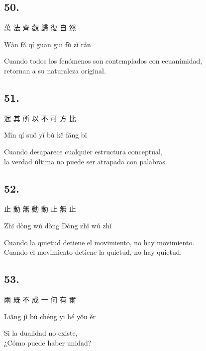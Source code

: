\documentclass[
  a5paperpaper,
]{article}
\begin{document}
\begin{verseblock}

\hypertarget{section-124}{%
\subsection{50.}\label{section-124}}

萬 法 齊 觀 歸 復 自 然

Wàn fă qí guān guī fù zì rán

Cuando todos los fenómenos son contemplados con ecuanimidad,\\
retornan a su naturaleza original.

\end{verseblock}

\begin{verseblock}

\hypertarget{section-125}{%
\subsection{51.}\label{section-125}}

泯 其 所 以 不 可 方 比

Mĭn qí suŏ yĭ bù kě fāng bĭ

Cuando desaparece cualquier estructura conceptual,\\
la verdad última no puede ser atrapada con palabras.

\end{verseblock}

\begin{verseblock}

\hypertarget{section-126}{%
\subsection{52.}\label{section-126}}

止 動 無 動 動 止 無 止

Zhĭ dòng wú dòng Dòng zhĭ wú zhĭ

Cuando la quietud detiene el movimiento, no hay movimiento.\\
Cuando el movimiento detiene la quietud, no hay quietud.

\end{verseblock}

\begin{verseblock}

\hypertarget{section-127}{%
\subsection{53.}\label{section-127}}

兩 既 不 成 一 何 有 爾

Liăng jì bù chéng yī hé yŏu ěr

Si la dualidad no existe,\\
¿Cómo puede haber unidad?

\end{verseblock}
\end{document}
